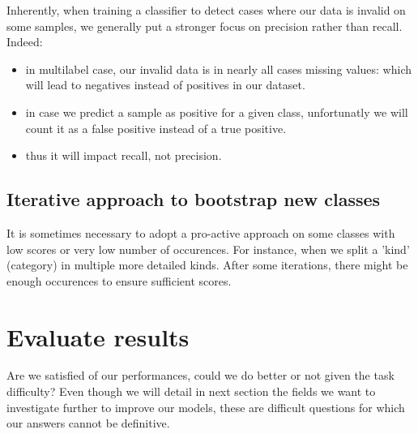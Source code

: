 Inherently, when training a classifier to detect cases where our data is invalid on some samples, we generally put a stronger focus on precision rather than recall. Indeed:
\begin{itemize}
	\item in multilabel case, our invalid data is in nearly all cases missing values: which will lead to negatives instead of positives in our dataset.
	\item in case we predict a sample as positive for a given class, unfortunatly we will count it as a false positive instead of a true positive.
	\item thus it will impact recall, not precision.
\end{itemize}

\subsection{Iterative approach to bootstrap new classes}

It is sometimes necessary to adopt a pro-active approach on some classes with low scores or very low number of occurences. 
For instance, when we split a 'kind' (category) in multiple more detailed kinds.
After some iterations, there might be enough occurences to ensure sufficient scores.

\section{Evaluate results}

Are we satisfied of our performances, could we do better or not given the task difficulty? Even though we will detail in next section the fields we want to investigate further to improve our models, these are difficult questions for which our answers cannot be definitive.

